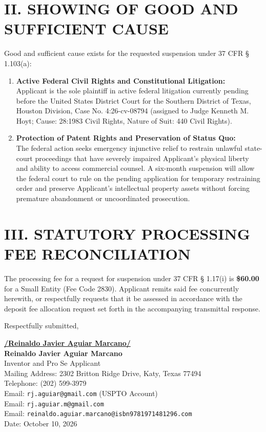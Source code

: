 \documentclass[11pt,letterpaper]{article}
\begin{document}
\section*{II. SHOWING OF GOOD AND SUFFICIENT CAUSE}

Good and sufficient cause exists for the requested suspension under 37 CFR \S{} 1.103(a):
\begin{enumerate}[leftmargin=*]
    \item \textbf{Active Federal Civil Rights and Constitutional Litigation:} \\
    Applicant is the sole plaintiff in active federal litigation currently pending before the United States District Court for the Southern District of Texas, Houston Division, Case No. 4:26-cv-08794 (assigned to Judge Kenneth M. Hoyt; Cause: 28:1983 Civil Rights, Nature of Suit: 440 Civil Rights).

    \item \textbf{Protection of Patent Rights and Preservation of Status Quo:} \\
    The federal action seeks emergency injunctive relief to restrain unlawful state-court proceedings that have severely impaired Applicant's physical liberty and ability to access commercial counsel. A six-month suspension will allow the federal court to rule on the pending application for temporary restraining order and preserve Applicant's intellectual property assets without forcing premature abandonment or uncoordinated prosecution.
\end{enumerate}

\section*{III. STATUTORY PROCESSING FEE RECONCILIATION}

The processing fee for a request for suspension under 37 CFR \S{} 1.17(i) is \textbf{\$60.00} for a Small Entity (Fee Code 2830). Applicant remits said fee concurrently herewith, or respectfully requests that it be assessed in accordance with the deposit fee allocation request set forth in the accompanying transmittal response.

\vspace{0.4cm}
\begin{singlespace}
\noindent Respectfully submitted, \par\vspace{0.8cm}
\underline{\textbf{/Reinaldo Javier Aguiar Marcano/}} \\
\textbf{Reinaldo Javier Aguiar Marcano} \\
Inventor and Pro Se Applicant \\
Mailing Address: 2302 Britton Ridge Drive, Katy, Texas 77494 \\
Telephone: (202) 599-3979 \\
Email: \texttt{rj.aguiar@gmail.com} (USPTO Account) \\
Email: \texttt{rj.aguiar.m@gmail.com} \\
Email: \texttt{reinaldo.aguiar.marcano@isbn9781971481296.com} \\
Date: October 10, 2026
\end{singlespace}
\end{document}
